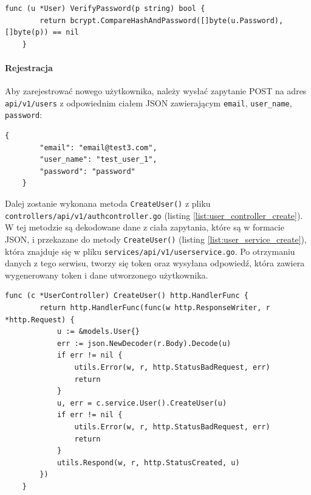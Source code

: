 \begin{lstlisting}[label=list:validate_password,caption=Porównywanie hasła,basicstyle=\tiny\ttfamily]
    func (u *User) VerifyPassword(p string) bool {
        return bcrypt.CompareHashAndPassword([]byte(u.Password), []byte(p)) == nil
    }
\end{lstlisting}

\paragraph{Rejestracja\newline}
Aby zarejestrować nowego użytkownika, należy wysłać zapytanie POST na adres \texttt{api/v1/users} z odpowiednim ciałem JSON zawierającym \texttt{email}, \texttt{user\_name}, \texttt{password}:
\begin{lstlisting}[basicstyle=\tiny\ttfamily]
    {
        "email": "email@test3.com",
        "user_name": "test_user_1",
        "password": "password"
    }
\end{lstlisting}

Dalej zostanie wykonana metoda \texttt{CreateUser()} z pliku \texttt{controllers/api/v1/authcontroller.go} (listing \ref{list:user_controller_create}).
W tej metodzie są dekodowane dane z ciała zapytania, które są w formacie JSON, i przekazane do metody \texttt{CreateUser()} (listing \ref{list:user_service_create}), która znajduje się w pliku \texttt{services/api/v1/userservice.go}. Po otrzymaniu danych z tego serwisu, tworzy się token oraz wysyłana odpowiedź, która zawiera wygenerowany token i dane utworzonego użytkownika.
\begin{lstlisting}[label=list:user_controller_create,caption=Kontroler tworzenia użytkownika,basicstyle=\tiny\ttfamily]
    func (c *UserController) CreateUser() http.HandlerFunc {
        return http.HandlerFunc(func(w http.ResponseWriter, r *http.Request) {
            u := &models.User{}
            err := json.NewDecoder(r.Body).Decode(u)
            if err != nil {
                utils.Error(w, r, http.StatusBadRequest, err)
                return
            }
            u, err = c.service.User().CreateUser(u)
            if err != nil {
                utils.Error(w, r, http.StatusBadRequest, err)
                return
            }
            utils.Respond(w, r, http.StatusCreated, u)
        })
    }
\end{lstlisting}

